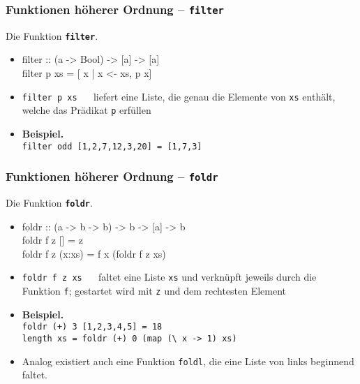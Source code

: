\documentclass[aspectratio=1610,onlymath, ngerman]{beamer}
\renewcommand{\emph}[1]{\textbf{#1}}
\begin{document}
	\begin{frame}\frametitle{Funktionen höherer Ordnung -- \texttt{filter}}
	\normalsize 
	{\Large Die Funktion \emph{\texttt{filter}}.} \\ \medskip
	\begin{itemize}
		\item 
		\begin{ttfamily}
			filter :: (a -> Bool) -> [a] -> [a] \\
			filter p xs = [ x | x <- xs, p x]
		\end{ttfamily}
		\pause \smallskip
		\item \texttt{filter p xs} $\quad$ liefert eine Liste, die genau die Elemente von \texttt{xs} enthält, welche das Prädikat \texttt{p} erfüllen
		\pause \smallskip
		\item \emph{Beispiel.} \\
		\texttt{filter odd [1,2,7,12,3,20] = [1,7,3]}
	\end{itemize}
	\end{frame}

	\begin{frame}\frametitle{Funktionen höherer Ordnung -- \texttt{foldr}}
		\normalsize 
		{\Large Die Funktion \emph{\texttt{foldr}}.} \\ \medskip
		\begin{itemize}
			\item 
			\begin{ttfamily}
				foldr :: (a -> b -> b) -> b -> [a] -> b \\
				foldr f z []     = z \\
				foldr f z (x:xs) = f x (foldr f z xs) 
			\end{ttfamily}
			\pause \smallskip
			\item \texttt{foldr f z xs} $\quad$ faltet eine Liste \texttt{xs} und verknüpft jeweils durch die Funktion \texttt{f}; gestartet wird mit \texttt{z} und dem rechtesten Element
			\pause \smallskip
			\item \emph{Beispiel.} \\
			\texttt{foldr (+) 3 [1,2,3,4,5] = 18} \\
			\texttt{length xs = foldr (+) 0 (map (\textbackslash \!\!\! x -> 1) xs) }
			\pause \smallskip
			\item Analog existiert auch eine Funktion \texttt{foldl}, die eine Liste von links beginnend faltet.
		\end{itemize}
	\end{frame}
\end{document}
